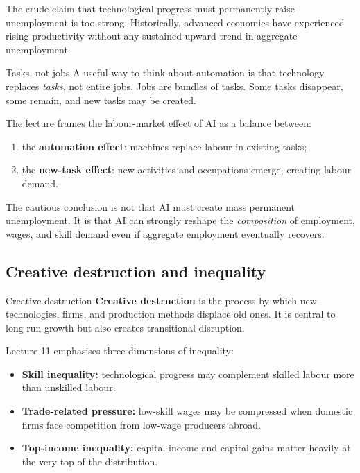 \documentclass[12pt]{article}
\begin{document}
The crude claim that technological progress must permanently raise unemployment is too strong. Historically, advanced economies have experienced rising productivity without any sustained upward trend in aggregate unemployment.

\begin{definition}{Tasks, not jobs}{}
A useful way to think about automation is that technology replaces \emph{tasks}, not entire jobs. Jobs are bundles of tasks. Some tasks disappear, some remain, and new tasks may be created.
\end{definition}

The lecture frames the labour-market effect of AI as a balance between:
\begin{enumerate}[leftmargin=1.5em]
\item the \textbf{automation effect}: machines replace labour in existing tasks;
\item the \textbf{new-task effect}: new activities and occupations emerge, creating labour demand.
\end{enumerate}

\begin{policynote}
The cautious conclusion is not that AI must create mass permanent unemployment. It is that AI can strongly reshape the \emph{composition} of employment, wages, and skill demand even if aggregate employment eventually recovers.
\end{policynote}

\subsection{Creative destruction and inequality}

\begin{definition}{Creative destruction}{}
\textbf{Creative destruction} is the process by which new technologies, firms, and production methods displace old ones. It is central to long-run growth but also creates transitional disruption.
\end{definition}

Lecture 11 emphasises three dimensions of inequality:
\begin{itemize}[leftmargin=1.5em]
\item \textbf{Skill inequality:} technological progress may complement skilled labour more than unskilled labour.
\item \textbf{Trade-related pressure:} low-skill wages may be compressed when domestic firms face competition from low-wage producers abroad.
\item \textbf{Top-income inequality:} capital income and capital gains matter heavily at the very top of the distribution.
\end{itemize}
\end{document}
